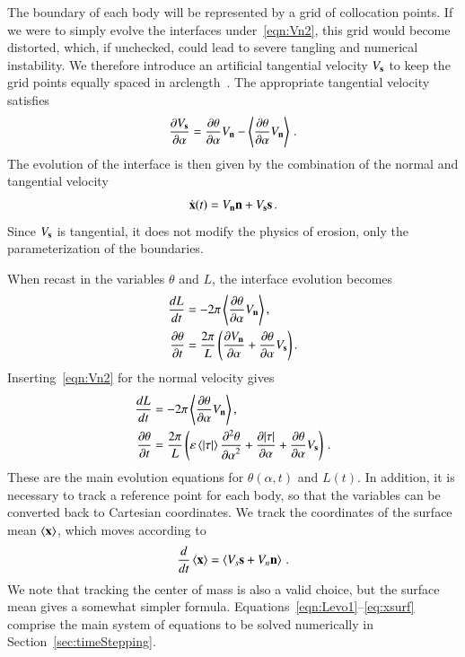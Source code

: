 \documentclass[preprint, 10pt]{elsarticle}
\begin{document}
The boundary of each body will be represented by a grid of collocation
points. If we were to simply evolve the interfaces
under~\eqref{eqn:Vn2}, this grid would become distorted, which, if
unchecked, could lead to severe tangling and numerical instability. We
therefore introduce an artificial tangential velocity $V_{\mathbf{s}}$ to keep the grid points equally spaced in arclength~\cite{hou-low-she1994}. The appropriate tangential velocity satisfies 
\begin{align}
\frac{\partial V_{\mathbf{s}}}{\partial \alpha} = \frac{\partial \theta}{\partial \alpha} V_{\mathbf{n}} - \left< \frac{\partial \theta}{\partial \alpha} V_{\mathbf{n}} \right> \, .
\end{align}
The evolution of the interface is then given by the combination of the normal and tangential velocity
\begin{align}
\dot{{\mathbf{x}}}(t) = V_{\mathbf{n}} {\mathbf{n}} + V_{\mathbf{s}} {\mathbf{s}} \, .
\end{align}
Since $V_{\mathbf{s}}$ is tangential, it does not modify the physics of erosion, only the parameterization of the boundaries.

When recast in the variables $\theta$ and $L$, the interface evolution becomes
\begin{align}
\frac{d L}{d t} &= - 2 \pi \left< \frac{\partial \theta}{\partial \alpha} V_{\mathbf{n}} \right>, \\
\frac{\partial \theta}{\partial t} &= \frac{2 \pi}{L} \left( \frac{\partial V_{\mathbf{n}}}{\partial \alpha} +
\frac{\partial \theta}{\partial \alpha} V_{\mathbf{s}} \right).
\end{align}
Inserting~\eqref{eqn:Vn2} for the normal velocity gives
\begin{align}
\label{eqn:Levo1}
\frac{d L}{d t} &= - 2 \pi \left< \frac{\partial \theta}{\partial \alpha} V_{\mathbf{n}} \right>, \\
\label{eqn:thetaevo1}
\frac{\partial \theta}{\partial t} &= \frac{2\pi}{L} \left(
\varepsilon \left< \lvert \tau \rvert \right> \frac{\partial^2 \theta}{{\partial \alpha}^2} + \frac{\partial \lvert \tau \rvert}{\partial \alpha} +
\frac{\partial \theta}{\partial \alpha} V_{\mathbf{s}} \right)\,.
\end{align}
These are the main evolution equations for $\theta(\alpha,t)$ and $L(t)$.
In addition, it is necessary to track a reference point for each body, so that the {\thL} variables can be converted back to Cartesian coordinates. We track the coordinates of the surface mean $\left< {\mathbf{x}} \right>$, which moves according to
\begin{align}
\label{eq:xsurf}
\frac{d}{dt} \left< {\mathbf{x}} \right> = \left<  V_s {\mathbf{s}} + V_n {\mathbf{n}}  \right> \, .
\end{align}
We note that tracking the center of mass is also a valid choice, but the surface mean gives a somewhat simpler formula. Equations~\eqref{eqn:Levo1}--\eqref{eq:xsurf} comprise the main system of equations to be solved numerically in Section~\ref{sec:timeStepping}. 

\end{document}
